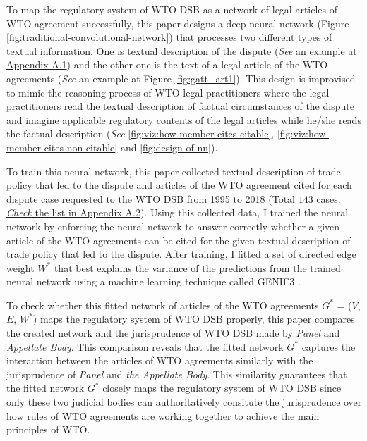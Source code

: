 To map the regulatory system of WTO DSB as 
a network of legal articles of WTO agreement 
successfully,
this paper designs a deep neural network (Figure \ref{fig:traditional-convolutional-network}) that
processes two different types of textual information.
One is textual description of the dispute (\textit{See} an example at \hyperref[sub:factual-aspect-example]{Appendix A.1}) and
the other one is the text of a legal article of the WTO agreements (\textit{See} an example at Figure \ref{fig:gatt_art1}).
This design is improvised to mimic
the reasoning process of WTO legal practitioners
where the legal practitioners read
the textual description of
factual circumstances of the dispute and imagine applicable regulatory contents of
the legal articles while he/she reads the factual description (\textit{See} \ref{fig:viz:how-member-cites-citable}, \ref{fig:viz:how-member-cites-non-citable} and \ref{fig:design-of-nn}).


To train this neural network, this paper collected textual description of trade policy 
that led to the dispute and articles of the WTO agreement cited for each dispute
case requested to the WTO DSB 
from 1995 to 2018 (\hyperref[sub:cited-articles-table]{Total $143$ cases. \textit{Check} the list in Appendix A.2}).
Using this collected data, I trained the neural network by enforcing the neural network to answer correctly 
whether a given article of the WTO agreements
can be cited for the given textual description of 
trade policy that led to the dispute.
After training, I fitted a set of directed edge weight $W^*$ that best explains the variance of the predictions from the trained neural network%
 using a machine learning technique called GENIE3 \citep{genie3}. 

To check whether this fitted network of articles of the WTO agreements $G^*$ = ($V$, $E$, $W^*$) maps the regulatory system of WTO DSB properly, this paper
compares the created network and the jurisprudence of WTO DSB made by \textit{Panel} and \textit{Appellate Body}. 
This comparison reveals that the fitted network $G^*$ captures the interaction between the articles of WTO agreements
similarly with the jurisprudence of \textit{Panel} and \textit{the Appellate Body}. This similarity guarantees that the fitted network $G^*$ closely maps the regulatory system of WTO DSB since only these two judicial bodies 
can authoritatively consitute the jurisprudence over how rules of WTO agreements are working together 
to achieve the main principles of WTO.

